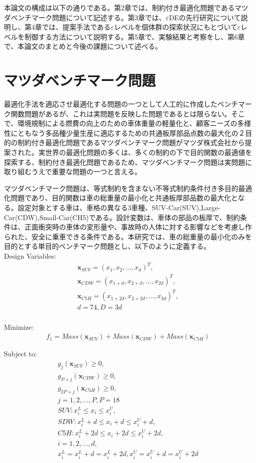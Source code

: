 \documentclass[a4paper,12pt]{jsreport}
\begin{document}
本論文の構成は以下の通りである。第2章では、制約付き最適化問題であるマツダベンチマーク問題について記述する。第3章では、$\varepsilon$DEの先行研究\cite{先行研究}について説明し、第4章では、提案手法である$\varepsilon$レベルを個体群の探索状況にもとづいて$\varepsilon$レベルを制御する方法について説明する。第5章で、実験結果と考察をし、第6章で、本論文のまとめと今後の課題について述べる。


\chapter{マツダベンチマーク問題}
最適化手法を適応させ最適化する問題の一つとして人工的に作成したベンチマーク関数問題があるが、これは実問題を反映した問題であるとは限らない。そこで、環境規制による燃費の向上のための車体重量の軽量化と、顧客ニーズの多様性にともなう多品種少量生産に適応するための共通板厚部品点数の最大化の２目的の制約付き最適化問題であるマツダベンチマーク問題がマツダ株式会社から提案された\cite{マツダベンチマーク問題}。実世界の最適化問題の多くは、多くの制約の下で目的関数の最適値を探索する、制約付き最適化問題であるため、マツダベンチマーク問題は実問題に取り組むうえで重要な問題の一つと言える。

マツダベンチマーク問題は、等式制約を含まない不等式制約条件付き多目的最適化問題であり、目的関数は車の総重量の最小化と共通板厚部品数の最大化となる。設定対象とする車は、車格の異なる3車種、SUV-Car(SUV),Large-Car(CDW),Small-Car(CH5)である。設計変数は、車体の部品の板厚で、制約条件は、正面衝突時の車体の変形量や、事故時の人体に対する影響などを考慮し作られた、安全に乗車できる条件である。本研究では、車の総重量の最小化のみを目的とする単目的ベンチマーク問題とし、以下のように定義する\cite{マツダベンチマーク問題}。
\\
{\large{Design Variables:}}
\begin{eqnarray}
\bm{x}_{SUV}={({x}_1,{x}_2,...,{x}_d)}^T,\\
\bm{x}_{CDW}={({x}_{1+d},{x}_{2+d},...,{x}_{2d})}^T,\\
\bm{x}_{C5H}={({x}_{1+2d},{x}_{2+2d},...,{x}_{3d})}^T,\\
d=74,D=3d\nonumber
\end{eqnarray}
\\
{\large{Minimize:}}
\begin{eqnarray}
{f}_1=Mass(\bm{x}_{SUV})+Mass(\bm{x}_{CDW})+Mass(\bm{x}_{C5H})
\end{eqnarray}

{\large{Subject to:}}
\begin{eqnarray}
{g}_j(\bm{x}_{SUV})\geq0,\\
{g}_{P+j}(\bm{x}_{CDW})\geq0,\\
{g}_{2P+j}(\bm{x}_{C5H})\geq0,\\
j=1,2,...,P,P=18\nonumber\\
SUV:{x}^L_i\leq {x}_i\leq {x}^U_i,\\
SDW:{x}^L_i+d\leq {x}_i+d\leq {x}^U_i+d,\\
C5H:{x}^L_i+2d\leq {x}_i+2d\leq {x}^U_i+2d,\\
i=1,2,...,d,\nonumber\\
{x}^L_i={x}^L_i+d={x}^L_i+2d,{x}^U_i={x}^U_i+d={x}^U_i+2d
\end{eqnarray}
\end{document}
